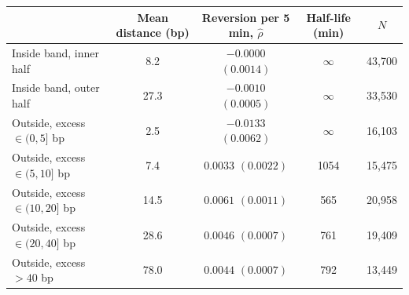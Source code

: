 \begin{tabular}{lcccc}
\toprule
 & Mean distance (bp) & Reversion per 5 min, $\hat\rho$ & Half-life (min) & $N$ \\
\midrule
Inside band, inner half & 8.2 & $-0.0000$ $(0.0014)$ & $\infty$ & 43,700 \\
Inside band, outer half & 27.3 & $-0.0010$ $(0.0005)$ & $\infty$ & 33,530 \\
Outside, excess $\in(0,5]$ bp & 2.5 & $-0.0133$ $(0.0062)$ & $\infty$ & 16,103 \\
Outside, excess $\in(5,10]$ bp & 7.4 & $0.0033$ $(0.0022)$ & 1054 & 15,475 \\
Outside, excess $\in(10,20]$ bp & 14.5 & $0.0061$ $(0.0011)$ & 565 & 20,958 \\
Outside, excess $\in(20,40]$ bp & 28.6 & $0.0046$ $(0.0007)$ & 761 & 19,409 \\
Outside, excess $>40$ bp & 78.0 & $0.0044$ $(0.0007)$ & 792 & 13,449 \\
\bottomrule
\end{tabular}
